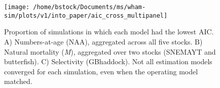 \documentclass[]{article}
\begin{document}
\pagebreak

\begin{figure}

{\centering \texttt{[image: /home/bstock/Documents/ms/wham-sim/plots/v1/into\_paper/aic\_cross\_multipanel]} 

}

\caption{Proportion of simulations in which each model had the lowest AIC. A) Numbers-at-age (NAA), aggregated across all five stocks. B) Natural mortality (\textit{M}), aggregated over two stocks (SNEMAYT and butterfish). C) Selectivity (GBhaddock). Not all estimation models converged for each simulation, even when the operating model matched.}\label{fig:aic-cross}
\end{figure}
\end{document}
